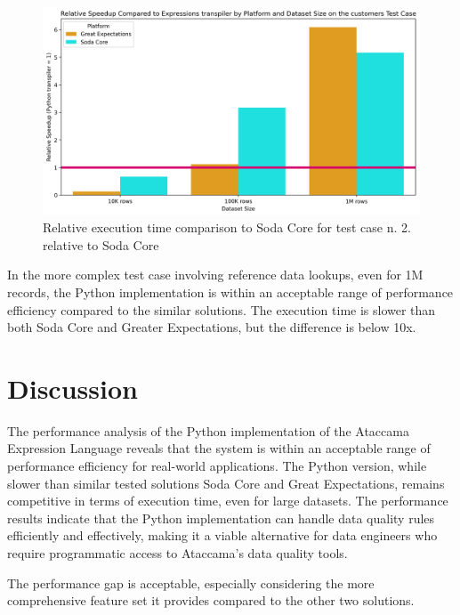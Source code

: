 \begin{figure}[htbp]
  \centering
  \includegraphics[width=1.0\columnwidth]{result-analysis/plots/relative_speedup_comparison_customers.png}
  \caption{Relative execution time comparison to Soda Core for test case n. 2. relative to Soda Core}
  \label{fig:time-comparison-customers-relative}
\end{figure}

In the more complex test case involving reference data lookups, even for 1M records, the Python implementation is within an acceptable range of performance efficiency compared to the similar solutions. The execution time is slower than both Soda Core and Greater Expectations, but the difference is below 10x. 

\section{Discussion}


The performance analysis of the Python implementation of the Ataccama Expression Language reveals that the system is within an acceptable range of performance efficiency for real-world applications. The Python version, while slower than similar tested solutions Soda Core and Great Expectations, remains competitive in terms of execution time, even for large datasets. The performance results indicate that the Python implementation can handle data quality rules efficiently and effectively, making it a viable alternative for data engineers who require programmatic access to Ataccama's data quality tools.

The performance gap is acceptable, especially considering the more comprehensive feature set it provides compared to the other two solutions. 




